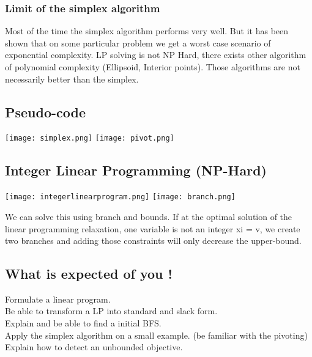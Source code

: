 \subsubsection{Limit of the simplex algorithm}
Most of the time the simplex algorithm performs very well. But it has been shown that on some particular problem we get a worst case scenario of exponential complexity. LP solving is not NP Hard, there exists other algorithm of polynomial complexity (Ellipsoid, Interior points). Those algorithms are not necessarily better than the simplex.

\subsection{Pseudo-code}

\texttt{[image: simplex.png]}
\texttt{[image: pivot.png]}

\subsection{Integer Linear Programming (NP-Hard)}

\texttt{[image: integerlinearprogram.png]}
\texttt{[image: branch.png]}

We can solve this using branch and bounds. If at the optimal solution of the linear programming relaxation, one variable is not an integer xi = v, we create two branches and adding those constraints will only decrease the upper-bound.

\subsection{What is expected of you !}
Formulate a linear program. \\
Be able to transform a LP into standard and slack form. \\
Explain and be able to find a initial BFS. \\
Apply the simplex algorithm on a small example. (be familiar with the pivoting)\\
Explain how to detect an unbounded objective.
